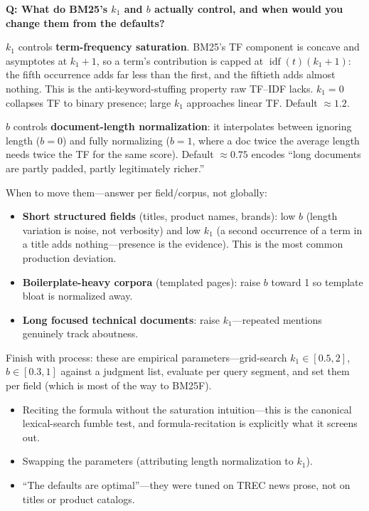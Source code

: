 \begin{interviewq}
\textbf{Q: What do BM25's $k_1$ and $b$ actually control, and when would you change them from the defaults?}

 \quad {} \quad \badgefreq{\freqhigh}

\stronganswer

$k_1$ controls \textbf{term-frequency saturation}. BM25's TF component is concave and asymptotes at $k_1 + 1$, so a term's contribution is capped at $\operatorname{idf}(t)(k_1+1)$: the fifth occurrence adds far less than the first, and the fiftieth adds almost nothing. This is the anti-keyword-stuffing property raw TF--IDF lacks. $k_1 = 0$ collapses TF to binary presence; large $k_1$ approaches linear TF. Default $\approx 1.2$.

$b$ controls \textbf{document-length normalization}: it interpolates between ignoring length ($b=0$) and fully normalizing ($b=1$, where a doc twice the average length needs twice the TF for the same score). Default $\approx 0.75$ encodes ``long documents are partly padded, partly legitimately richer.''

When to move them---answer per field/corpus, not globally:
\begin{itemize}
    \item \textbf{Short structured fields} (titles, product names, brands): low $b$ (length variation is noise, not verbosity) and low $k_1$ (a second occurrence of a term in a title adds nothing---presence is the evidence). This is the most common production deviation.
    \item \textbf{Boilerplate-heavy corpora} (templated pages): raise $b$ toward 1 so template bloat is normalized away.
    \item \textbf{Long focused technical documents}: raise $k_1$---repeated mentions genuinely track aboutness.
\end{itemize}
Finish with process: these are empirical parameters---grid-search $k_1 \in [0.5,2]$, $b \in [0.3,1]$ against a judgment list, evaluate per query segment, and set them per field (which is most of the way to BM25F).

\redflags
\begin{itemize}
    \item Reciting the formula without the saturation intuition---this is the canonical lexical-search fumble test, and formula-recitation is explicitly what it screens out.
    \item Swapping the parameters (attributing length normalization to $k_1$).
    \item ``The defaults are optimal''---they were tuned on TREC news prose, not on titles or product catalogs.
\end{itemize}


\end{interviewq}
